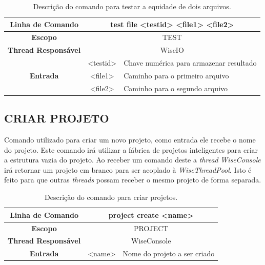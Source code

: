\begin{center}
	\begin{table}[!htbp]
		\begin{tabularx}{\textwidth}{c|c|X}
			\toprule
			\textbf{Linha de Comando} & \multicolumn{2}{c}{test file <test\underline{\space\space}id> <file1> <file2>} \\
			\midrule
			\textbf{Escopo} & \multicolumn{2}{c}{TEST} \\
			\hline
			\textbf{Thread Responsável} & \multicolumn{2}{c}{WiseIO} \\
			\hline
			\multirow{3}{*}{\textbf{Entrada}} & <test\underline{\space\space}id> & Chave numérica para armazenar resultado \\
			& <file1> & Caminho para o primeiro arquivo \\
			& <file2> & Caminho para o segundo arquivo \\
			\bottomrule
		\end{tabularx}
		\caption{Descrição do comando para testar a equidade de dois arquivos.}
		\label{tab:file_test}
	\end{table}
\end{center}

\subsection{CRIAR PROJETO}\label{sec:create_projects}

Comando utilizado para criar um novo projeto, como entrada ele recebe o nome do projeto. Este comando irá utilizar a fábrica de projetos inteligentes para criar a estrutura vazia do projeto. Ao receber um comando deste a \textit{thread} \textit{WiseConsole} irá retornar um projeto em branco para ser acoplado à \textit{WiseThreadPool}. Isto é feito para que outras \textit{threads} possam receber o mesmo projeto de forma separada.

\begin{center}
	\begin{table}[!htbp]
		\begin{tabularx}{\textwidth}{c|c|X}
			\toprule
			\textbf{Linha de Comando} & \multicolumn{2}{c}{project create <name>} \\
			\midrule
			\textbf{Escopo} & \multicolumn{2}{c}{PROJECT} \\
			\hline
			\textbf{Thread Responsável} & \multicolumn{2}{c}{WiseConsole} \\
			\hline
			\textbf{Entrada} & <name> & Nome do projeto a ser criado \\
			\bottomrule
		\end{tabularx}
		\caption{Descrição do comando para criar projetos.}
		\label{tab:create_project}
	\end{table}
\end{center}

